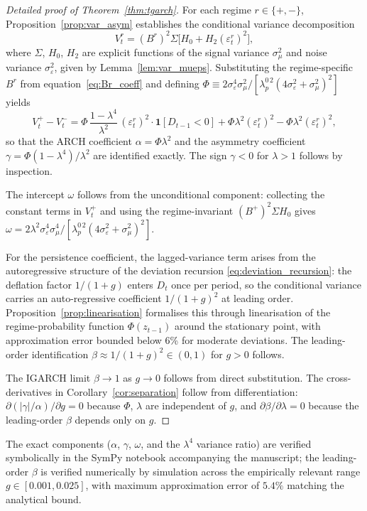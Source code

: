 \documentclass[12pt,a4paper]{article}
\theoremstyle{definition}
\begin{document}
\begin{proof}[Detailed proof of Theorem~\ref{thm:tgarch}]
For each regime $r \in \{+, -\}$,
Proposition~\ref{prop:var_asym} establishes the conditional variance
decomposition
\[
  V^r_t = (B^r)^2\Sigma\bigl[H_0 + H_2(\varepsilon^r_t)^2\bigr],
\]
where $\Sigma$, $H_0$, $H_2$ are explicit functions of the signal
variance $\sigma^2_\mu$ and noise variance $\sigma^2_\varepsilon$, given
by Lemma~\ref{lem:var_mueps}. Substituting the regime-specific
$B^r$ from equation~\eqref{eq:Br_coeff} and defining
$\Phi \equiv 2\sigma^4_\varepsilon\sigma^2_\mu/[\lambda^{0\,2}_p
(4\sigma^2_\varepsilon + \sigma^2_\mu)^2]$ yields
\[
  V^+_t - V^-_t = \Phi\,\frac{1-\lambda^4}{\lambda^2}\,
                  (\varepsilon^r_t)^2 \cdot
                  \mathbf{1}[D_{t-1} < 0]
                + \Phi\lambda^2 (\varepsilon^r_t)^2 - \Phi\lambda^2 (\varepsilon^r_t)^2,
\]
so that the ARCH coefficient $\alpha = \Phi\lambda^2$ and the asymmetry
coefficient $\gamma = \Phi(1-\lambda^4)/\lambda^2$ are identified
exactly. The sign $\gamma < 0$ for $\lambda > 1$ follows by inspection.

The intercept $\omega$ follows from the unconditional component:
collecting the constant terms in
$V^+_t$ and using the regime-invariant $(B^+)^2\Sigma H_0$ gives
$\omega = 2\lambda^2\sigma^4_\varepsilon\sigma^4_\mu /
[\lambda^{0\,2}_p(4\sigma^2_\varepsilon + \sigma^2_\mu)^2]$.

For the persistence coefficient, the lagged-variance term arises from
the autoregressive structure of the deviation recursion
\eqref{eq:deviation_recursion}: the deflation factor $1/(1+g)$ enters
$D_t$ once per period, so the conditional variance carries an
auto-regressive coefficient $1/(1+g)^2$ at leading order.
Proposition~\ref{prop:linearisation} formalises this through
linearisation of the regime-probability function $\Phi(z_{t-1})$ around
the stationary point, with approximation error bounded below 6\% for
moderate deviations. The leading-order identification
$\beta \approx 1/(1+g)^2 \in (0,1)$ for $g > 0$ follows.

The IGARCH limit $\beta \to 1$ as $g \to 0$ follows from direct
substitution. The cross-derivatives in
Corollary~\ref{cor:separation} follow from differentiation:
$\partial(|\gamma|/\alpha)/\partial g = 0$ because $\Phi$, $\lambda$ are
independent of $g$, and $\partial\beta/\partial\lambda = 0$ because the
leading-order $\beta$ depends only on $g$.
\end{proof}

The exact components ($\alpha$, $\gamma$, $\omega$, and the
$\lambda^4$ variance ratio) are verified symbolically in the SymPy
notebook accompanying the manuscript; the leading-order $\beta$ is
verified numerically by simulation across the empirically relevant
range $g \in [0.001, 0.025]$, with maximum approximation error of
$5.4\%$ matching the analytical bound.
\end{document}
